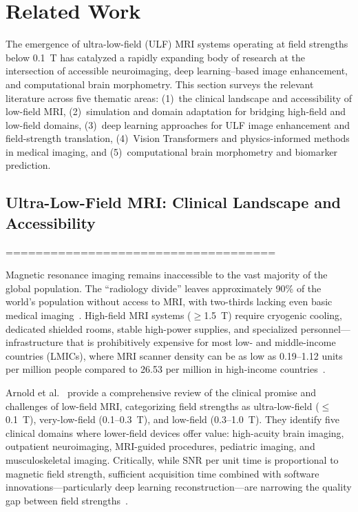 \section{Related Work}

The emergence of ultra-low-field (ULF) MRI systems operating at field strengths below 0.1~T has catalyzed a rapidly expanding body of research at the intersection of accessible neuroimaging, deep learning--based image enhancement, and computational brain morphometry. This section surveys the relevant literature across five thematic areas: (1)~the clinical landscape and accessibility of low-field MRI, (2)~simulation and domain adaptation for bridging high-field and low-field domains, (3)~deep learning approaches for ULF image enhancement and field-strength translation, (4)~Vision Transformers and physics-informed methods in medical imaging, and (5)~computational brain morphometry and biomarker prediction.

\subsection{Ultra-Low-Field MRI: Clinical Landscape and Accessibility}
====================================

Magnetic resonance imaging remains inaccessible to the vast majority of the global population. The ``radiology divide'' leaves approximately 90\% of the world's population without access to MRI, with two-thirds lacking even basic medical imaging~\cite{arnold2023review}. High-field MRI systems ($\geq$1.5~T) require cryogenic cooling, dedicated shielded rooms, stable high-power supplies, and specialized personnel---infrastructure that is prohibitively expensive for most low- and middle-income countries (LMICs), where MRI scanner density can be as low as 0.19--1.12 units per million people compared to 26.53 per million in high-income countries~\cite{arnold2023review, ringshaw2026infant}.

Arnold et al.~\cite{arnold2023review} provide a comprehensive review of the clinical promise and challenges of low-field MRI, categorizing field strengths as ultra-low-field ($\leq$0.1~T), very-low-field (0.1--0.3~T), and low-field (0.3--1.0~T). They identify five clinical domains where lower-field devices offer value: high-acuity brain imaging, outpatient neuroimaging, MRI-guided procedures, pediatric imaging, and musculoskeletal imaging. Critically, while SNR per unit time is proportional to magnetic field strength, sufficient acquisition time combined with software innovations---particularly deep learning reconstruction---are narrowing the quality gap between field strengths~\cite{arnold2023review}.

